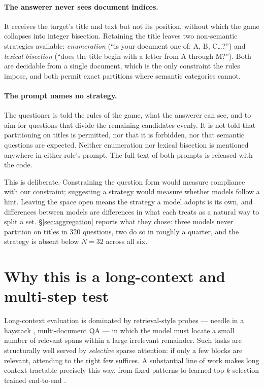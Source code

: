 \documentclass[11pt]{article}
\begin{document}
\paragraph{The answerer never sees document indices.} It receives the target's
title and text but not its position, without which the game collapses into
integer bisection. Retaining the title leaves two non-semantic strategies
available: \emph{enumeration} (``is your document one of: A, B, C\dots?'') and
\emph{lexical bisection} (``does the title begin with a letter from A through
M?''). Both are decidable from a single document, which is the only constraint
the rules impose, and both permit exact partitions where semantic categories
cannot.

\paragraph{The prompt names no strategy.} The questioner is told the rules of
the game, what the answerer can see, and to aim for questions that divide the
remaining candidates evenly. It is not told that partitioning on titles is
permitted, nor that it is forbidden, nor that semantic questions are expected.
Neither enumeration nor lexical bisection is mentioned anywhere in either role's
prompt. The full text of both prompts is released with the code.

This is deliberate. Constraining the question form would measure compliance with
our constraint; suggesting a strategy would measure whether models follow a
hint. Leaving the space open means the strategy a model adopts is its own, and
differences between models are differences in what each treats as a natural way
to split a set. \S\ref{sec:aggregation} reports what they chose: three models
never partition on titles in 320 questions, two do so in roughly a quarter, and
the strategy is absent below $N{=}32$ across all six.

\section{Why this is a long-context and multi-step test}
\label{sec:longctx}

Long-context evaluation is dominated by retrieval-style probes --- needle in a
haystack \citep{kamradt2023}, multi-document QA \citep{liu2024lost} --- in which
the model must locate a small number of relevant spans within a large irrelevant
remainder. Such tasks are structurally well served by \emph{selective} sparse attention:
if only a few blocks are relevant, attending to the right few suffices. A
substantial line of work makes long context tractable precisely this way, from
fixed patterns \citep{child2019,beltagy2020,zaheer2020} to learned top-$k$
selection trained end-to-end \citep{yuan2025nsa,lu2025moba}.
\end{document}
